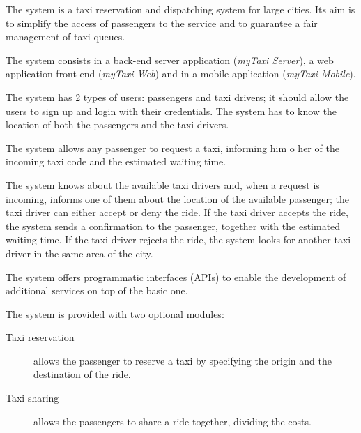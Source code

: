 The system is a taxi reservation and dispatching system for large cities. Its aim is to simplify the access of passengers to the service and to guarantee a fair management of taxi queues.

The system consists in a back-end server application (\emph{myTaxi Server}), a web application front-end (\emph{myTaxi Web}) and in a mobile application (\emph{myTaxi Mobile}).

The system has 2 types of users: passengers and taxi drivers; it should allow the users to sign up and login with their credentials.
The system has to know the location of both the passengers and the taxi drivers.

The system allows any passenger to request a taxi, informing him o her of the incoming taxi code and the estimated waiting time.

The system knows about the available taxi drivers and, when a request is incoming, informs one of them about the location of the available passenger; the taxi driver can either accept or deny the ride.
If the taxi driver accepts the ride, the system sends a confirmation to the passenger, together with the estimated waiting time.
If the taxi driver rejects the ride, the system looks for another taxi driver in the same area of the city.

The system offers programmatic interfaces (APIs) to enable the development of additional services on top of the basic one.

The system is provided with two optional modules:
\begin{description}
\item[Taxi reservation] allows the passenger to reserve a taxi by specifying the origin and the destination of the ride.
\item[Taxi sharing] allows the passengers to share a ride together, dividing the costs.
\end{description}
